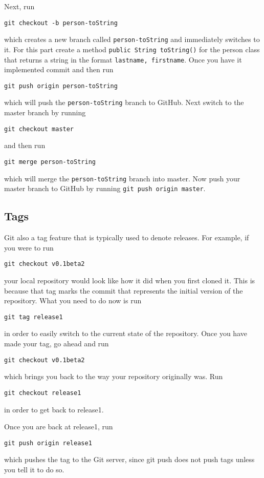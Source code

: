 \documentclass[notitlepage]{simple}
\begin{document}
Next, run
\begin{terminal}
	\verb|git checkout -b person-toString|
\end{terminal}
which creates a new branch called \verb|person-toString| and immediately switches to it.
For this part create a method \verb|public String toString()| for the person class that returns a string in the format \linebreak\verb|lastname, firstname|.
Once you have it implemented commit and then run
\begin{terminal}
	\verb|git push origin person-toString|
\end{terminal}
which will push the \verb|person-toString| branch to GitHub.
Next switch to the master branch by running
\begin{terminal}
	\verb|git checkout master|
\end{terminal}
and then run
\begin{terminal}
	\verb|git merge person-toString|
\end{terminal}
which will merge the \verb|person-toString| branch into master.
Now push your master branch to GitHub by running \verb|git push origin master|.

\subsection{Tags}

Git also a tag feature that is typically used to denote releases.
For example, if you were to run
\begin{terminal}
	\verb|git checkout v0.1beta2|
\end{terminal}
your local repository would look like how it did when you first cloned it.
This is because that tag marks the commit that represents the initial version of the repository.
What you need to do now is run
\begin{terminal}
	\verb|git tag release1|
\end{terminal}
in order to easily switch to the current state of the repository.
Once you have made your tag, go ahead and run
\begin{terminal}
	\verb|git checkout v0.1beta2|
\end{terminal}
which brings you back to the way your repository originally was.
Run
\begin{terminal}
	\verb|git checkout release1|
\end{terminal}
in order to get back to release1.

Once you are back at release1, run
\begin{terminal}
	\verb|git push origin release1|
\end{terminal}
which pushes the tag to the Git server, since git push does not push tags unless you tell it to do so.
\end{document}
